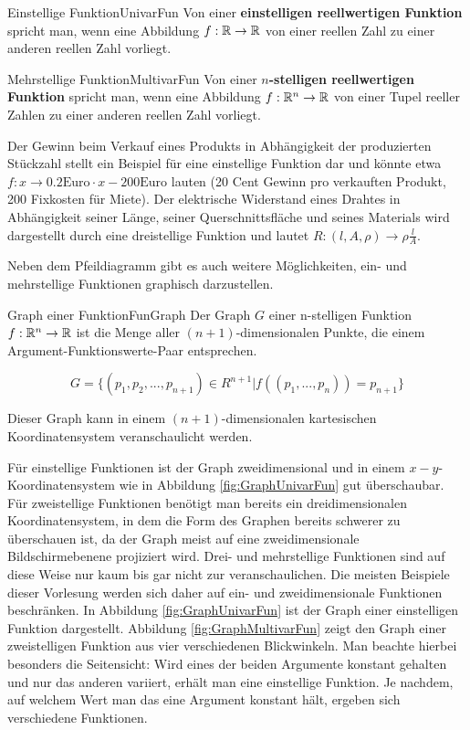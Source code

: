 \begin{definition}{Einstellige Funktion}{UnivarFun}
    Von einer \textbf{einstelligen reellwertigen Funktion} spricht man, wenn eine Abbildung $f: \mathbb{R} \to \mathbb{R}$ von einer reellen Zahl zu einer anderen reellen Zahl vorliegt.
\end{definition}

\begin{definition}{Mehrstellige Funktion}{MultivarFun}
    Von einer \textbf{$n$-stelligen reellwertigen Funktion} spricht man, wenn eine Abbildung $f: \mathbb{R}^n \to \mathbb{R}$ von einer Tupel reeller Zahlen zu einer anderen reellen Zahl vorliegt.
\end{definition}

Der Gewinn beim Verkauf eines Produkts in Abhängigkeit der produzierten Stückzahl stellt ein Beispiel für eine einstellige Funktion dar und könnte etwa $f: x \to 0.2\text{Euro} \cdot x - 200\text{Euro}$ lauten (20 Cent Gewinn pro verkauften Produkt, 200  Fixkosten für Miete). Der elektrische Widerstand eines Drahtes in Abhängigkeit seiner Länge, seiner Querschnittsfläche und seines Materials wird dargestellt durch eine dreistellige Funktion und lautet $R: (l, A, \rho) \to \rho \frac{l}{A}$.

Neben dem Pfeildiagramm gibt es auch weitere Möglichkeiten, ein- und mehrstellige Funktionen graphisch darzustellen.

\begin{definition}{Graph einer Funktion}{FunGraph}
    Der Graph $G$ einer n-stelligen Funktion $f: \mathbb{R}^n \to \mathbb{R}$ ist die Menge aller $(n+1)$-dimensionalen Punkte, die einem Argument-Funktionswerte-Paar entsprechen.

    $$
    G = \lbrace (p_1, p_2, ..., p_{n+1}) \in R^{n+1} | f((p_1, ..., p_n)) = p_{n+1} \rbrace
    $$

    Dieser Graph kann in einem $(n+1)$-dimensionalen kartesischen Koordinatensystem veranschaulicht werden.
\end{definition}

Für einstellige Funktionen ist der Graph zweidimensional und in einem $x-y$-Koordinatensystem wie in Abbildung \ref{fig:GraphUnivarFun} gut überschaubar. Für zweistellige Funktionen benötigt man bereits ein dreidimensionalen Koordinatensystem, in dem die Form des Graphen bereits schwerer zu überschauen ist, da der Graph meist auf eine zweidimensionale Bildschirmebenene projiziert wird. Drei- und mehrstellige Funktionen sind auf diese Weise nur kaum bis gar nicht zur veranschaulichen. Die meisten Beispiele dieser Vorlesung werden sich daher auf ein- und zweidimensionale Funktionen beschränken. In Abbildung \ref{fig:GraphUnivarFun} ist der Graph einer einstelligen Funktion dargestellt. Abbildung \ref{fig:GraphMultivarFun} zeigt den Graph einer zweistelligen Funktion aus vier verschiedenen Blickwinkeln. Man beachte hierbei besonders die Seitensicht: Wird eines der beiden Argumente konstant gehalten und nur das anderen variiert, erhält man eine einstellige Funktion. Je nachdem, auf welchem Wert man das eine Argument konstant hält, ergeben sich verschiedene Funktionen.

